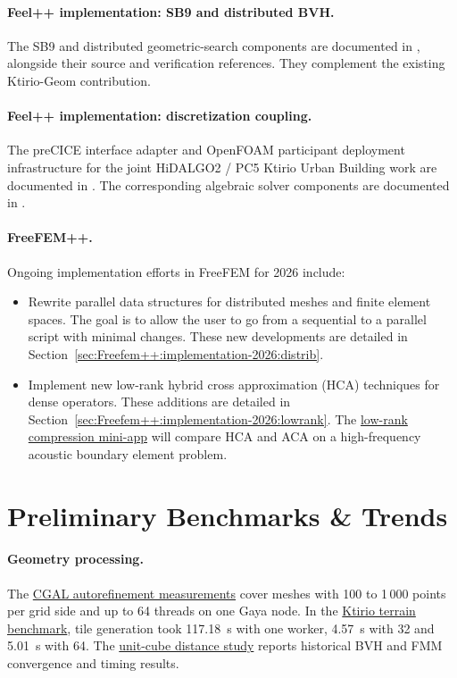 \paragraph{Feel++ implementation: SB9 and distributed BVH.}
The SB9 and distributed geometric-search components are documented in , alongside their source and verification references. They complement the existing Ktirio-Geom contribution.

\paragraph{Feel++ implementation: discretization coupling.}
The preCICE interface adapter and OpenFOAM participant deployment infrastructure
for the joint HiDALGO2 / PC5 Ktirio Urban Building work are documented in
. The corresponding algebraic
solver components are documented in
.

\paragraph{FreeFEM++.}

Ongoing implementation efforts in FreeFEM for 2026 include:
\begin{itemize}
\item Rewrite parallel data structures for distributed meshes and finite element spaces. The goal is to allow the user to go from a sequential to a parallel script with minimal changes. These new developments are detailed in Section~\ref{sec:Freefem++:implementation-2026:distrib}.
\item Implement new low-rank hybrid cross approximation (HCA) techniques for dense operators. These additions are detailed in Section~\ref{sec:Freefem++:implementation-2026:lowrank}. The \hyperref[sec:app:specs:app-freefem-lowrank]{low-rank compression mini-app} will compare HCA and ACA on a high-frequency acoustic boundary element problem.
\end{itemize}

\section{Preliminary Benchmarks \& Trends}
\label{sec:wp1:benchmarks}

\paragraph{Geometry processing.}
The \hyperref[benchmark:results:app-cgal-autorefine]{CGAL autorefinement
measurements} cover meshes with 100 to 1\,000 points per grid side and
up to 64 threads on one Gaya node. In the
\hyperref[benchmark:results:app-feelpp-ktirio-geom]{Ktirio terrain
benchmark}, tile generation took 117.18~s with one worker, 4.57~s
with 32 and 5.01~s with 64. The
\hyperref[sec:app:specs:app-feelpp-distance]{unit-cube distance study}
reports historical BVH and FMM convergence and timing results.

